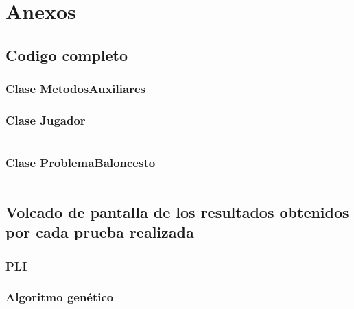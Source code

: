 \documentclass[a4paper,12pt]{article}
\begin{document}
\section{Anexos}
\subsection{Codigo completo}
\subsubsection{Clase MetodosAuxiliares}
\subsubsection{Clase Jugador}
\inputminted[fontsize=\footnotesize,breaklines]{java}{src/code/Jugador.java}

\subsubsection{Clase ProblemaBaloncesto}
\inputminted[fontsize=\footnotesize,breaklines]{java}{src/code/ProblemaBaloncesto.java}


\subsection{Volcado de pantalla de los resultados obtenidos por cada prueba realizada}
\subsubsection{PLI}
\subsubsection{Algoritmo genético}
\end{document}
